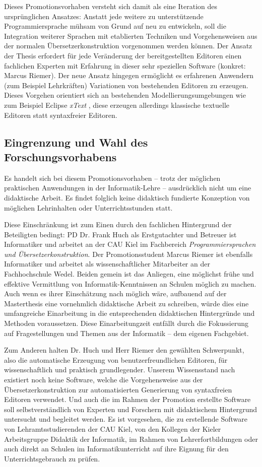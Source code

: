 \documentclass[paper=a4,fontsize=11pt,parskip=half]{scrartcl}
\begin{document}
Dieses Promotionsvorhaben versteht sich damit als eine Iteration des ursprünglichen Ansatzes: Anstatt jede weitere zu unterstützende Programmiersprache mühsam von Grund auf neu zu entwickeln, soll die Integration weiterer Sprachen mit etablierten Techniken und Vorgehensweisen aus der normalen Übersetzerkonstruktion vorgenommen werden können. Der Ansatz der Thesis erfordert für jede Veränderung der bereitgestellten Editoren einen fachlichen Experten mit Erfahrung in dieser sehr speziellen Software (konkret: Marcus Riemer). Der neue Ansatz hingegen ermöglicht es erfahrenen Anwendern (zum Beispiel Lehrkräften) Variationen von bestehenden Editoren zu erzeugen. Dieses Vorgehen orientiert sich an bestehenden Modellierungsumgebungen wie zum Beispiel Eclipse \textit{xText} \cite{efftinge_oaw_2006}, diese erzeugen allerdings klassische textuelle Editoren statt syntaxfreier Editoren.

\subsection{Eingrenzung und Wahl des Forschungsvorhabens}

Es handelt sich bei diesem Promotionsvorhaben -- trotz der möglichen praktischen Anwendungen in der Informatik-Lehre -- ausdrücklich nicht um eine didaktische Arbeit. Es findet folglich keine didaktisch fundierte Konzeption von möglichen Lehrinhalten oder Unterrichtsstunden statt.

Diese Einschränkung ist zum Einen durch den fachlichen Hintergrund der Beteiligten bedingt: PD Dr. Frank Huch als Erstgutachter und Betreuer ist Informatiker und arbeitet an der CAU Kiel im Fachbereich \textit{Programmiersprachen und Übersetzerkonstruktion}. Der Promotionsstudent Marcus Riemer ist ebenfalls Informatiker und arbeitet als wissenschaftlicher Mitarbeiter an der Fachhochschule Wedel. Beiden gemein ist das Anliegen, eine möglichst frühe und effektive Vermittlung von Informatik-Kenntnissen an Schulen möglich zu machen. Auch wenn es ihrer Einschätzung nach möglich wäre, aufbauend auf der Masterthesis eine vornehmlich didaktische Arbeit zu schreiben, würde dies eine umfangreiche Einarbeitung in die entsprechenden didaktischen Hintergründe und Methoden voraussetzen. Diese Einarbeitungzeit entfällt durch die Fokussierung auf Fragestellungen und Themen aus der Informatik -- dem eigenen Fachgebiet.

Zum Anderen halten Dr. Huch und Herr Riemer den gewählten Schwerpunkt, also die automatische Erzeugung von benutzerfreundlichen Editoren, für wissenschaftlich und praktisch grundlegender. Unserem Wissensstand nach existiert noch keine Software, welche die Vorgehensweise aus der Übersetzerkonstruktion zur automatisierten Generierung von syntaxfreien Editoren verwendet. Und auch die im Rahmen der Promotion erstellte Software soll selbstverständlich von Experten und Forschern mit didaktischem Hintergrund untersucht und begleitet werden. Es ist vorgesehen, die zu erstellende Software von Lehramtsstudierenden der CAU Kiel, von den Kollegen der Kieler Arbeitsgruppe Didaktik der Informatik, im Rahmen von Lehrerfortbildungen oder auch direkt an Schulen im Informatikunterricht auf ihre Eignung für den Unterrichtsgebrauch zu prüfen.
\end{document}
